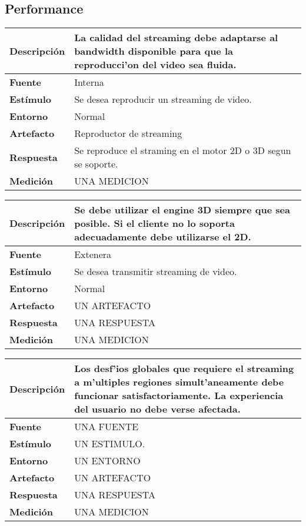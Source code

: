 \subsection{Performance}
\begin{center}
  \begin{tabular}{| l | p{10cm} | }
    \hline
  \textbf{Descripción} & La calidad del streaming debe adaptarse al bandwidth disponible para que la reproducci'on del video sea fluida.\\  \hline
  \textbf{Fuente} & Interna\\  \hline
  \textbf{Estímulo} & Se desea reproducir un streaming de video.\\  \hline
  \textbf{Entorno} & Normal\\  \hline
  \textbf{Artefacto} & Reproductor de streaming\\  \hline
  \textbf{Respuesta} & Se reproduce el straming en el motor 2D o 3D segun se soporte.\\  \hline
  \textbf{Medición} & UNA MEDICION\\  \hline
  \end{tabular}
\end{center} 


\begin{center}
  \begin{tabular}{| l | p{10cm} | }
    \hline
  \textbf{Descripción} & Se debe utilizar el engine 3D siempre que sea posible. Si el cliente no lo soporta adecuadamente debe utilizarse el 2D.\\  \hline
  \textbf{Fuente} & Extenera\\  \hline
  \textbf{Estímulo} & Se desea transmitir streaming de video.\\  \hline
  \textbf{Entorno} & Normal\\  \hline
  \textbf{Artefacto} & UN ARTEFACTO\\  \hline
  \textbf{Respuesta} & UNA RESPUESTA\\  \hline
  \textbf{Medición} & UNA MEDICION\\  \hline
  \end{tabular}
\end{center} 



\begin{center}
  \begin{tabular}{| l | p{10cm} | }
    \hline
  \textbf{Descripción} & Los desf'ios globales que requiere el streaming a m'ultiples regiones simult'aneamente debe funcionar satisfactoriamente. La experiencia del usuario no debe verse afectada.\\  \hline
  \textbf{Fuente} & UNA FUENTE\\  \hline
  \textbf{Estímulo} & UN ESTIMULO.\\  \hline
  \textbf{Entorno} & UN ENTORNO\\  \hline
  \textbf{Artefacto} & UN ARTEFACTO\\  \hline
  \textbf{Respuesta} & UNA RESPUESTA\\  \hline
  \textbf{Medición} & UNA MEDICION\\  \hline
  \end{tabular}
\end{center} 


